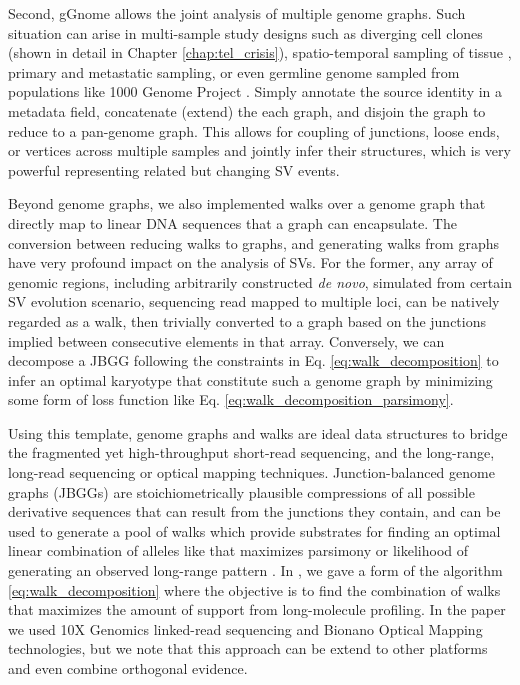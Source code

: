\documentclass[phd,tocprelim]{cornell}
\begin{document}
Second, gGnome allows the joint analysis of multiple genome graphs. Such situation can arise in multi-sample study designs such as diverging cell clones (shown in detail in Chapter \ref{chap:tel_crisis}), spatio-temporal sampling of tissue \cite{Paulson2021-nd}, primary and metastatic sampling, or even germline genome sampled from populations like 1000 Genome Project \cite{Khurana2013-qc}. Simply annotate the source identity in a metadata field, concatenate (extend) the each graph, and disjoin the graph to reduce to a pan-genome graph. This allows for coupling of junctions, loose ends, or vertices across multiple samples and jointly infer their structures, which is very powerful representing related but changing SV events.

Beyond genome graphs, we also implemented walks over a genome graph that directly map to linear DNA sequences that a graph can encapsulate. The conversion between reducing walks to graphs, and generating walks from graphs have very profound impact on the analysis of SVs. For the former, any array of genomic regions, including arbitrarily constructed \textit{de novo}, simulated from certain SV evolution scenario, sequencing read mapped to multiple loci, can be natively regarded as a walk, then trivially converted to a graph based on the junctions implied between consecutive elements in that array. Conversely, we can decompose a JBGG following the constraints in Eq. \ref{eq:walk_decomposition} to infer an optimal karyotype that constitute such a genome graph by minimizing some form of loss function like Eq. \ref{eq:walk_decomposition_parsimony}.

Using this template, genome graphs and walks are ideal data structures to bridge the fragmented yet high-throughput short-read sequencing, and the long-range, long-read sequencing or optical mapping techniques. Junction-balanced genome graphs (JBGGs) are stoichiometrically plausible compressions of all possible derivative sequences that can result from the junctions they contain, and can be used to generate a pool of walks which provide substrates for finding an optimal linear combination of alleles like that maximizes parsimony or likelihood of generating an observed long-range pattern \cite{Hadi2020-um}. In \cite{Hadi2020-um}, we gave a form of the algorithm \ref{eq:walk_decomposition} where the objective is to find the combination of walks that maximizes the amount of support from long-molecule profiling. In the paper we used 10X Genomics linked-read sequencing and Bionano Optical Mapping technologies, but we note that this approach can be extend to other platforms and even combine orthogonal evidence.
\end{document}
